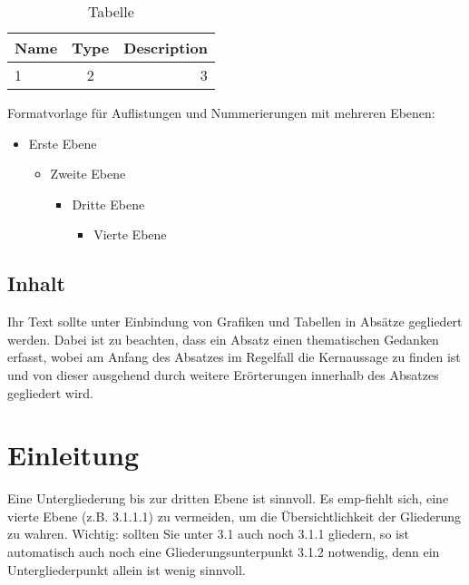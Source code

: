 \documentclass[12pt, oneside]{article}
\begin{document}
\begin{table}[H]
\centering
\caption{Tabelle}
\label{Tab1}
\def\arraystretch{1.2}%
\begin{tabular}{ | l | c | r | }
 \hline	
 Name & Type & Description \\ 
  \hline			
  1 & 2 & 3 \\
  \hline  
\end{tabular}
\end{table}

Formatvorlage für Auflistungen und Nummerierungen mit mehreren Ebenen:
\begin{itemize}
    \item Erste Ebene
    \begin{itemize}
        \item Zweite Ebene
        \begin{itemize}
            \item Dritte Ebene
            \begin{itemize}
                \item Vierte Ebene
            \end{itemize}
        \end{itemize}
    \end{itemize}
\end{itemize}


\subsection{Inhalt}
Ihr Text sollte unter Einbindung von Grafiken und Tabellen in Absätze gegliedert werden. Dabei ist zu beachten, dass ein Absatz einen thematischen Gedanken erfasst, wobei am Anfang des Absatzes im Regelfall die Kernaussage zu finden ist und von dieser ausgehend durch weitere Erörterungen innerhalb des Absatzes gegliedert wird. 

\newpage

\section{Einleitung} \label{sec:einleitung}

Eine Untergliederung bis zur dritten Ebene ist sinnvoll. Es emp-fiehlt sich, eine vierte Ebene (z.B. 3.1.1.1) zu vermeiden, um die Übersichtlichkeit der Gliederung zu wahren. Wichtig: sollten Sie unter 3.1 auch noch 3.1.1 gliedern, so ist automatisch auch noch eine Gliederungsunterpunkt 3.1.2 notwendig, denn ein Untergliederpunkt allein ist wenig sinnvoll.
\end{document}
